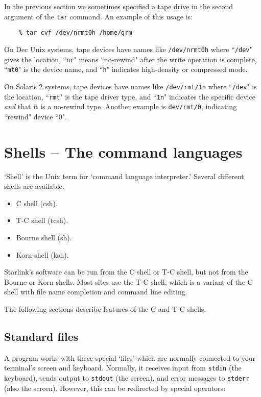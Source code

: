 \documentclass[twoside,11pt]{article}
\begin{document}
In the previous section we sometimes specified a tape drive in the second
argument of the {\tt tar} command.
An example of this usage is:
\begin{verbatim}
    % tar cvf /dev/nrmt0h /home/grm
\end{verbatim}
On Dec Unix systems, tape devices have names like {\tt /dev/nrmt0h} where
``{\tt /dev}" gives the location,
``{\tt nr}" means ``no-rewind" after the write operation is complete,
``{\tt mt0}" is the device name, and
``{\tt h}" indicates high-density or compressed mode.

On Solaris 2 systems, tape devices have names like {\tt /dev/rmt/1n} where
``{\tt /dev}" is the location,
``{\tt rmt}" is the tape driver type, and
``{\tt 1n}" indicates the specific device {\em and}\/ that it is a
no-rewind type.
Another example is {\tt dev/rmt/0}, indicating ``rewind" device ``0".

\newpage

\section{Shells -- The command languages}

`Shell' is the Unix term for `command language interpreter.'
Several different shells are available:
\begin{itemize}
\item C shell (csh).
\item T-C shell (tcsh).
\item Bourne shell (sh).
\item Korn shell (ksh).
\end{itemize}
Starlink's software can be run from the C shell or T-C shell, but
not from the Bourne or Korn shells.
Most sites use the T-C shell, which is a variant of the C shell
with file name completion and command line editing.

The following sections describe features of the C and T-C shells.

\subsection{Standard files}

A program works with three special `files' which are normally connected to your
terminal's screen and keyboard.
Normally, it receives input from {\tt stdin} (the keyboard), sends output to
{\tt stdout} (the screen), and error messages to {\tt stderr} (also the screen).
However, this can be redirected by special operators:
\end{document}
